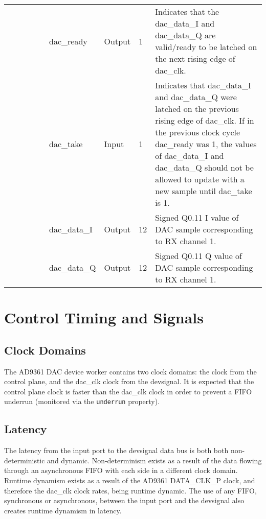 \documentclass{article}
\def\devsignal{devsignal}
\def\Comp{AD9361 DAC}
\begin{document}
\begin{landscape}
\begin{scriptsize}
\begin{tabular}{|p{1.75cm}|p{2.25cm}|p{1.25cm}|p{1.25cm}|p{1.25cm}|p{3cm}|p{1.4cm}|p{0.9cm}|p{6.88cm}|}
			&             &        &     &      & dac\_ready   & Output    & 1      & Indicates that the dac\_data\_I and dac\_data\_Q are valid/ready to be latched on the next rising edge of dac\_clk. \\
			\cline{6-9}
			&             &        &     &      & dac\_take    & Input     & 1      & Indicates that dac\_data\_I and dac\_data\_Q were latched on the previous rising edge of dac\_clk. If in the previous clock cycle dac\_ready was 1, the values of dac\_data\_I and dac\_data\_Q should not be allowed to update with a new sample until dac\_take is 1. \\
			\cline{6-9}
			&             &        &     &      & dac\_data\_I & Output    & 12     & Signed Q0.11 I value of DAC sample corresponding to RX channel 1. \\
			\cline{6-9}
			&             &        &     &      & dac\_data\_Q & Output    & 12     & Signed Q0.11 Q value of DAC sample corresponding to RX channel 1. \\
			\hline
		\end{tabular}
	\end{scriptsize}
\end{landscape}

\section*{Control Timing and Signals}
\subsection*{Clock Domains}
The \Comp{} device worker contains two clock domains: the clock from the control plane, and the dac\_clk clock from the \devsignal{}. It is expected that the control plane clock is faster than the dac\_clk clock in order to prevent a FIFO underrun (monitored via the \verb+underrun+ property).
\subsection*{Latency}
The latency from the input port to the \devsignal{} data bus is both both non-deterministic and dynamic. Non-determinism exists as a result of the data flowing through an asynchronous FIFO with each side in a different clock domain. Runtime dynamism exists as a result of the AD9361 DATA\_CLK\_P clock, and therefore the dac\_clk clock rates, being runtime dynamic. The use of any FIFO, synchronous or asynchronous, between the input port and the \devsignal{} also creates runtime dynamism in latency.
\end{document}
